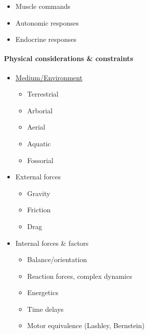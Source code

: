 \documentclass[
  letterpaper,
  DIV=11,
  numbers=noendperiod]{scrartcl}
\let\oldparagraph\paragraph
\renewcommand{\paragraph}[1]{\oldparagraph{#1}\mbox{}}
\providecommand{\tightlist}{%
  \setlength{\itemsep}{0pt}\setlength{\parskip}{0pt}}\usepackage{longtable,booktabs,array}
\begin{document}
\begin{itemize}
\tightlist
\item
  Muscle commands
\item
  Autonomic responses
\item
  Endocrine responses
\end{itemize}

\paragraph{Physical considerations \&
constraints}\label{physical-considerations-constraints}

\begin{itemize}
\tightlist
\item
  \href{https://en.wikipedia.org/wiki/Animal_locomotion}{Medium/Environment}

  \begin{itemize}
  \tightlist
  \item
    Terrestrial
  \item
    Arborial
  \item
    Aerial
  \item
    Aquatic
  \item
    Fossorial
  \end{itemize}
\item
  External forces

  \begin{itemize}
  \tightlist
  \item
    Gravity
  \item
    Friction
  \item
    Drag
  \end{itemize}
\item
  Internal forces \& factors

  \begin{itemize}
  \tightlist
  \item
    Balance/orientation
  \item
    Reaction forces, complex dynamics
  \item
    Energetics
  \item
    Time delays
  \item
    Motor equivalence (Lashley, Bernstein)
  \end{itemize}
\end{itemize}
\end{document}
